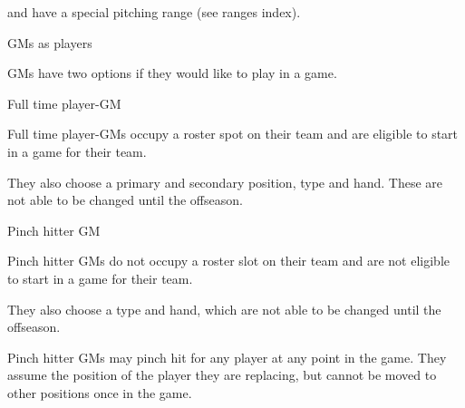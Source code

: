 \begin{deepEnumerate}
\begin{deepEnumerate}
\begin{deepEnumerate}
			and have a special pitching range (see ranges index). %
		\end{deepEnumerate}
		\item GMs as players
		\begin{deepEnumerate}
			\item GMs have two options if they would like to play in a game.
			\begin{deepEnumerate}
				\item Full time player-GM
				\begin{deepEnumerate}
					\item Full time player-GMs occupy a roster spot on their team
					and are eligible to start in a game for their team.
					\item They also choose a primary and secondary position, type and hand.
					These are not able to be changed until the offseason.
				\end{deepEnumerate}
				\item Pinch hitter GM
				\begin{deepEnumerate}
					\item Pinch hitter GMs do not occupy a roster slot on their team
					and are not eligible to start in a game for their team.
					\item They also choose a type and hand,
					which are not able to be changed until the offseason.
					\item Pinch hitter GMs may pinch hit for any player at any point in the game.
					They assume the position of the player they are replacing,
					but cannot be moved to other positions once in the game.
				\end{deepEnumerate}
			\end{deepEnumerate}
		\end{deepEnumerate}
	\end{deepEnumerate}
\end{deepEnumerate}

